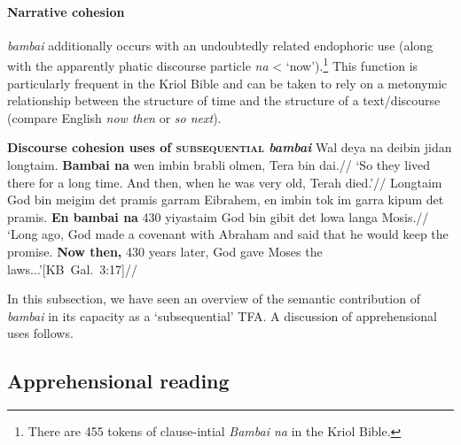  \paragraph{Narrative cohesion} \textit{bambai} additionally occurs with an undoubtedly related endophoric use (along with the apparently phatic discourse particle \textit{na} < `now').\footnote{There are 455 tokens of clause-intial \textit{Bambai na} in the Kriol Bible.} This function is particularly frequent in the Kriol Bible and can be taken to rely on a metonymic relationship between the structure of time and the structure of a text/discourse (compare English \textit{now then} or \textit{so next}).
 
 
 \pex \textbf{Discourse cohesion uses of \textsc{subsequential} \textit{bambai}}
 \a\begingl\gla Wal deya na deibin jidan longtaim. \textbf{Bambai na} wen imbin brabli olmen, Tera bin dai.//
 \glft`So they lived there for a long time. And then, when he was very old, Terah died.'\trailingcitation{[KB~Jen.~11.32]}//\endgl
 \a\begingl\gla Longtaim God bin meigim det pramis garram Eibrahem, en imbin tok im garra kipum det pramis. \textbf{En bambai na} 430 yiyastaim God bin gibit det lowa langa Mosis.//
 \glft`Long ago, God made a covenant with Abraham and said that he would keep the promise.\textbf{ Now then,} 430 years later, God gave Moses the laws...'\trailingcitation[{KB~Gal.~3:17]}//\endgl
 
 \xe
 
 

In this subsection, we have seen an overview of the semantic contribution of \textit{bambai} in its capacity as a `subsequential' TFA. A discussion of apprehensional uses follows. %


	\subsection{Apprehensional reading}\label{dataSapp}



